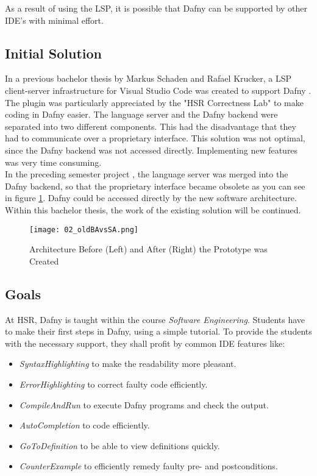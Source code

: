 As a result of using the LSP, it is possible that Dafny can be supported by other IDE's with minimal effort.

\subsection{Initial Solution}
\label{section:management_summary:initialsolution}
In a previous bachelor thesis by Markus Schaden and Rafael Krucker, a LSP client-server infrastructure for Visual Studio Code was created to support Dafny \cite{ba}.
The plugin was particularly appreciated by the "HSR Correctness Lab" \cite{correctnessLab} to make coding in Dafny easier.
The language server and the Dafny backend were separated into two different components.
This had the disadvantage that they had to communicate over a proprietary interface.
This solution was not optimal, since the Dafny backend was not accessed directly.
Implementing new features was very time consuming. \\

In the preceding semester project \cite{sa}, the language server was merged into the Dafny backend, so that the proprietary interface became obsolete as you can see in figure \ref{fig:oldBAvsSA}.
Dafny could be accessed directly by the new software architecture.
Within this bachelor thesis, the work of the existing solution will be continued.

\begin{figure}[H]
    \centering
    \texttt{[image: 02\_oldBAvsSA.png]}
    \caption{Architecture Before (Left) and After (Right) the Prototype was Created}
    \label{fig:oldBAvsSA}
\end{figure}

\subsection{Goals}
At HSR, Dafny is taught within the course \textit{Software Engineering}.
Students have to make their first steps in Dafny, using a simple tutorial.
To provide the students with the necessary support, they shall profit by common IDE features like:
\begin{itemize}
    \item \textit{SyntaxHighlighting} to make the readability more pleasant.
    \item \textit{ErrorHighlighting} to correct faulty code efficiently.
    \item \textit{CompileAndRun} to execute Dafny programs and check the output.
    \item \textit{AutoCompletion} to code efficiently.
    \item \textit{GoToDefinition} to be able to view definitions quickly.
    \item \textit{CounterExample} to efficiently remedy faulty pre- and postconditions.
\end{itemize}


